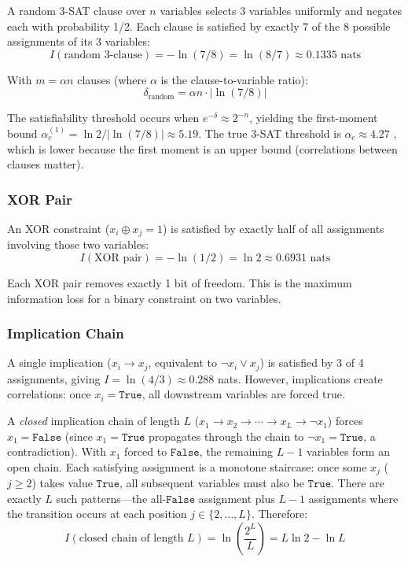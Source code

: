 \documentclass[11pt,a4paper]{article}
\begin{document}
A random 3-SAT clause over $n$ variables selects 3 variables uniformly and negates each with probability 1/2. Each clause is satisfied by exactly 7 of the 8 possible assignments of its 3 variables:
\begin{equation}
I(\text{random 3-clause}) = -\ln(7/8) = \ln(8/7) \approx 0.1335 \text{ nats}
\label{eq:delta-random}
\end{equation}

With $m = \alpha n$ clauses (where $\alpha$ is the clause-to-variable ratio):
\begin{equation}
\delta_{\text{random}} = \alpha n \cdot |\ln(7/8)|
\label{eq:delta-random-total}
\end{equation}

The satisfiability threshold occurs when $e^{-\delta} \approx 2^{-n}$, yielding the first-moment bound $\alpha_c^{(1)} = \ln 2 / |\ln(7/8)| \approx 5.19$. The true 3-SAT threshold is $\alpha_c \approx 4.27$ \citep{mezard2002,friedgut1999,achlioptas2009}, which is lower because the first moment is an upper bound (correlations between clauses matter).

\subsubsection{XOR Pair}

An XOR constraint ($x_i \oplus x_j = 1$) is satisfied by exactly half of all assignments involving those two variables:
\begin{equation}
I(\text{XOR pair}) = -\ln(1/2) = \ln 2 \approx 0.6931 \text{ nats}
\label{eq:delta-xor}
\end{equation}

Each XOR pair removes exactly 1 bit of freedom. This is the maximum information loss for a binary constraint on two variables.

\subsubsection{Implication Chain}

A single implication ($x_i \to x_j$, equivalent to $\neg x_i \lor x_j$) is satisfied by 3 of 4 assignments, giving $I = \ln(4/3) \approx 0.288$ nats. However, implications create correlations: once $x_i = \mathtt{True}$, all downstream variables are forced true.

A \emph{closed} implication chain of length $L$ ($x_1 \to x_2 \to \cdots \to x_L \to \neg x_1$) forces $x_1 = \mathtt{False}$ (since $x_1 = \mathtt{True}$ propagates through the chain to $\neg x_1 = \mathtt{True}$, a contradiction). With $x_1$ forced to $\mathtt{False}$, the remaining $L-1$ variables form an open chain. Each satisfying assignment is a monotone staircase: once some $x_j$ ($j \ge 2$) takes value $\mathtt{True}$, all subsequent variables must also be $\mathtt{True}$. There are exactly $L$ such patterns---the all-$\mathtt{False}$ assignment plus $L-1$ assignments where the transition occurs at each position $j \in \{2, \ldots, L\}$. Therefore:
\begin{equation}
I(\text{closed chain of length } L) = \ln\!\left(\frac{2^L}{L}\right) = L \ln 2 - \ln L
\label{eq:delta-impl}
\end{equation}
\end{document}
